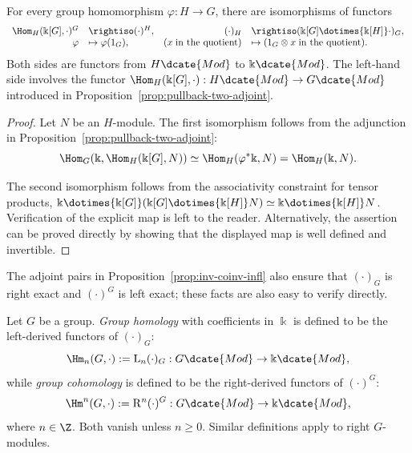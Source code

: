 \begin{corollary}\label{prop:Ind-invariant}
	For every group homomorphism $\varphi:H\to G$, there are isomorphisms of
	functors
	\[\begin{array}{rlrl}
		\Hom_H(\Bbbk[G], \cdot)^G & \rightiso (\cdot)^H, & (\cdot)_H & \rightiso (\Bbbk[G] \dotimes{\Bbbk[H]} \cdot)_G , \\
		\varphi & \mapsto \varphi(1_G), & (x \;\text{in the quotient}) & \mapsto (1_G \otimes x \;\text{in the quotient}) .
	\end{array}\]
	Both sides are functors from $H\dcate{Mod}$ to $\Bbbk\dcate{Mod}$. The
	left-hand side involves the functor
	$\Hom_H(\Bbbk[G],\cdot):H\dcate{Mod}\to G\dcate{Mod}$ introduced in
	Proposition~\ref{prop:pullback-two-adjoint}.
\end{corollary}
\begin{proof}
	Let $N$ be an $H$-module. The first isomorphism follows from the adjunction
	in Proposition~\ref{prop:pullback-two-adjoint}:
	\[ \Hom_G(\Bbbk, \Hom_H(\Bbbk[G], N)) \simeq \Hom_H(\varphi^* \Bbbk, N) = \Hom_H(\Bbbk, N). \]

	The second isomorphism follows from the associativity constraint for tensor
	products,
	$\Bbbk\dotimes{\Bbbk[G]}(\Bbbk[G]\dotimes{\Bbbk[H]}N)
	\simeq\Bbbk\dotimes{\Bbbk[H]}N$. Verification of the explicit map is left
	to the reader. Alternatively, the assertion can be proved directly by
	showing that the displayed map is well defined and invertible.
\end{proof}

The adjoint pairs in Proposition~\ref{prop:inv-coinv-infl} also ensure that
$(\cdot)_G$ is right exact and $(\cdot)^G$ is left exact; these facts are also
easy to verify directly.

\begin{definition}\label{def:group-coh-ho}
	Let $G$ be a group. \emph{Group homology} with coefficients in $\Bbbk$ is
	defined to be the left-derived functors of $(\cdot)_G$:
	\[ \Hm_n(G, \cdot) := \mathrm{L}_n (\cdot)_G: G\dcate{Mod} \to \Bbbk\dcate{Mod}, \]
	while \emph{group cohomology} is defined to be the right-derived functors of
	$(\cdot)^G$:
	\[ \Hm^n(G, \cdot) := \mathrm{R}^n (\cdot)^G: G\dcate{Mod} \to \Bbbk\dcate{Mod}, \]
	where $n\in\Z$. Both vanish unless $n\geq0$. Similar definitions apply to
	right $G$-modules.
\end{definition}

